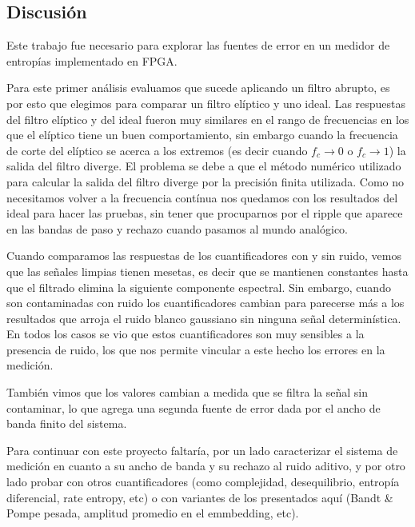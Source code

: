 \subsection{Discusión}
\label{sec:discusion}

Este trabajo fue necesario para explorar las fuentes de error en un medidor de entropías implementado en FPGA.

Para este primer análisis evaluamos que sucede aplicando un filtro abrupto, es por esto que elegimos para comparar un filtro elíptico y uno ideal. 
Las respuestas del filtro elíptico y del ideal fueron muy similares en el rango de frecuencias en los que el elíptico tiene un buen comportamiento, sin embargo cuando la frecuencia de corte del elíptico se acerca a los extremos (es decir cuando $f_c \to 0$ o $f_c \to 1$) la salida del filtro diverge.
El problema se debe a que el método numérico utilizado para calcular la salida del filtro diverge por la precisión finita utilizada.
Como no necesitamos volver a la frecuencia contínua nos quedamos con los resultados del ideal para hacer las pruebas, sin tener que procuparnos por el ripple que aparece en las bandas de paso y rechazo cuando pasamos al mundo analógico.

Cuando comparamos las respuestas de los cuantificadores con y sin ruido, vemos que las señales limpias tienen mesetas, es decir que se mantienen constantes hasta que el filtrado elimina la siguiente componente espectral.
Sin embargo, cuando son contaminadas con ruido los cuantificadores cambian para parecerse más a los resultados que arroja el ruido blanco gaussiano sin ninguna señal determinística.
En todos los casos se vio que estos cuantificadores son muy sensibles a la presencia de ruido, los que nos permite vincular a este hecho los errores en la medición.

También vimos que los valores cambian a medida que se filtra la señal sin contaminar, lo que agrega una segunda fuente de error dada por el ancho de banda finito del sistema.

Para continuar con este proyecto faltaría, por un lado caracterizar el sistema de medición en cuanto a su ancho de banda y su rechazo al ruido aditivo, y por otro lado probar con otros cuantificadores (como complejidad, desequilibrio, entropía diferencial, rate entropy, etc) o con variantes de los presentados aquí (Bandt \& Pompe pesada, amplitud promedio en el emmbedding, etc).
